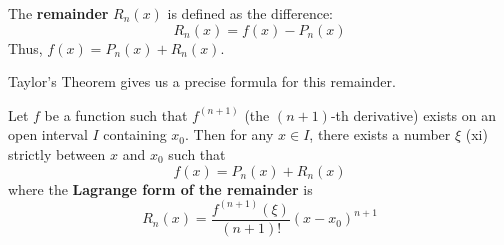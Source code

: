 \documentclass[oneside]{book}
\begin{document}
\begin{definition}[Remainder]
The \textbf{remainder} $R_n(x)$ is defined as the difference:
\[
R_n(x) = f(x) - P_n(x)
\]
Thus, $f(x) = P_n(x) + R_n(x)$.
\end{definition}

Taylor's Theorem gives us a precise formula for this remainder.

\begin{theorem}
\label{thm:taylor_en}
Let $f$ be a function such that $f^{(n+1)}$ (the $(n+1)$-th derivative) exists on an open interval $I$ containing $x_0$.
Then for any $x \in I$, there exists a number $\xi$ (xi) strictly between $x$ and $x_0$ such that
\[
f(x) = P_n(x) + R_n(x)
\]
where the \textbf{Lagrange form of the remainder} is
\[
R_n(x) = \frac{f^{(n+1)}(\xi)}{(n+1)!} (x-x_0)^{n+1}
\]
\end{theorem}
\end{document}
